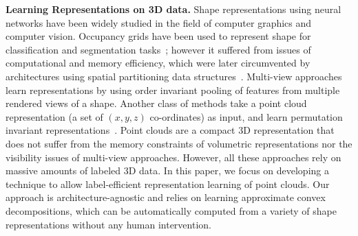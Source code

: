

\noindent\textbf{Learning Representations on 3D data.}
Shape representations using neural networks have been widely studied in the
field of computer graphics and computer vision. 
Occupancy grids have been used to represent shape for classification and segmentation
tasks~\cite{maturana2015voxnets}; however it suffered from issues of computational and memory efficiency,
which were later circumvented by architectures using spatial partitioning data structures~\cite{riegler2017octnet,klokov2017escape,wang2017ocnn,Wang:2018:AOP}.
Multi-view approaches~\cite{Huang:2017:LMVCNN,Tat2018,kalogerakis2017shapepfcn} learn representations 
by using order invariant pooling of features from multiple rendered views of a shape. 
Another class of methods take a point cloud representation (\ie a set of $(x, y, z)$ co-ordinates) as input, and learn permutation 
invariant representations~\cite{wang2019dynamic,mrt18,qi2017pointnet,qi2017pointnetpp,yang2019pointflow,hassani2019unsupervised}. 
Point clouds are a compact 3D representation that does not suffer from the memory constraints
of volumetric representations nor the visibility issues of multi-view approaches.
However, all these approaches rely on massive amounts of labeled 3D data. 
In this paper, we focus on developing a technique to allow label-efficient representation learning of point clouds.
Our approach is architecture-agnostic and relies on learning approximate convex decompositions, which
can be automatically computed from a variety of shape representations without any human intervention.

